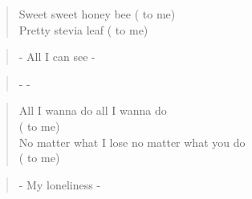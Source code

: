 \begin{verse}
Sweet sweet honey bee ( to me)\\
Pretty stevia leaf ( to me)
\end{verse}

\begin{verse}
- All I can see -
\end{verse}

\begin{verse}
-  -
\end{verse}

\begin{verse}
All I wanna do all I wanna do \\
( to me)\\
No matter what I lose no matter what you do \\
( to me)
\end{verse}

\begin{verse}
- My loneliness -
\end{verse}

\clearpage
